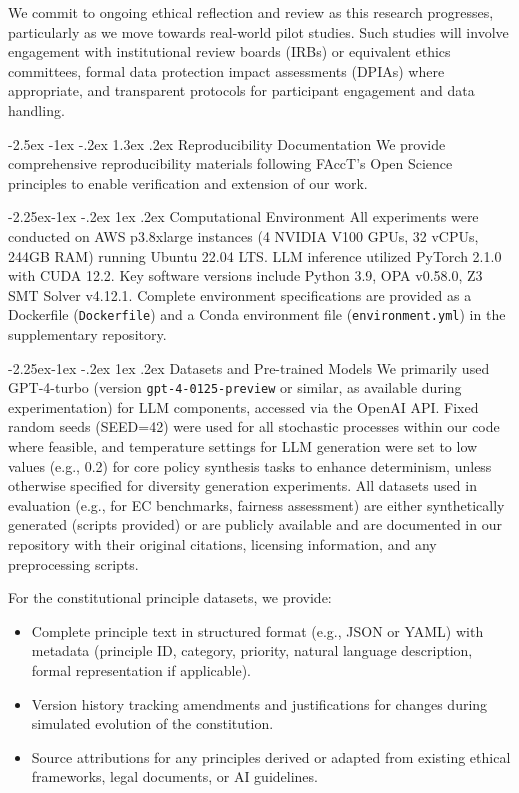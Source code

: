 \documentclass[manuscript,screen,review,anonymous,9pt]{acmart}
\makeatletter
\renewcommand\section{\@startsection{section}{1}{\z@}%
  {-2.5ex \@plus -1ex \@minus -.2ex}%
  {1.3ex \@plus.2ex}%
  {\normalfont\Large\bfseries}}
\renewcommand\subsection{\@startsection{subsection}{2}{\z@}%
  {-2.25ex\@plus -1ex \@minus -.2ex}%
  {1ex \@plus .2ex}%
  {\normalfont\large\bfseries}}
\makeatother
\begin{document}
We commit to ongoing ethical reflection and review as this research progresses, particularly as we move towards real-world pilot studies. Such studies will involve engagement with institutional review boards (IRBs) or equivalent ethics committees, formal data protection impact assessments (DPIAs) where appropriate, and transparent protocols for participant engagement and data handling.

\section{Reproducibility Documentation}
\label{app:reproducibility}
We provide comprehensive reproducibility materials following FAccT's Open Science principles to enable verification and extension of our work.

\subsection{Computational Environment}
All experiments were conducted on AWS p3.8xlarge instances (4 NVIDIA V100 GPUs, 32 vCPUs, 244GB RAM) running Ubuntu 22.04 LTS. LLM inference utilized PyTorch 2.1.0 with CUDA 12.2. Key software versions include Python 3.9, OPA v0.58.0, Z3 SMT Solver v4.12.1. Complete environment specifications are provided as a Dockerfile (\texttt{Dockerfile}) and a Conda environment file (\texttt{environment.yml}) in the supplementary repository.

\subsection{Datasets and Pre-trained Models}
We primarily used GPT-4-turbo (version \texttt{gpt-4-0125-preview} or similar, as available during experimentation) for LLM components, accessed via the OpenAI API. Fixed random seeds (SEED=42) were used for all stochastic processes within our code where feasible, and temperature settings for LLM generation were set to low values (e.g., 0.2) for core policy synthesis tasks to enhance determinism, unless otherwise specified for diversity generation experiments. All datasets used in evaluation (e.g., for EC benchmarks, fairness assessment) are either synthetically generated (scripts provided) or are publicly available and are documented in our repository with their original citations, licensing information, and any preprocessing scripts.

For the constitutional principle datasets, we provide:
\begin{itemize}[leftmargin=*,itemsep=1pt,parsep=1pt]
    \item Complete principle text in structured format (e.g., JSON or YAML) with metadata (principle ID, category, priority, natural language description, formal representation if applicable).
    \item Version history tracking amendments and justifications for changes during simulated evolution of the constitution.
    \item Source attributions for any principles derived or adapted from existing ethical frameworks, legal documents, or AI guidelines.
\end{itemize}
\end{document}
